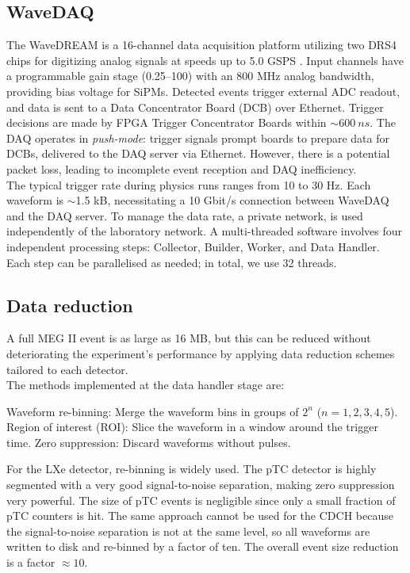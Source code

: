 \begin{refsection}
    \subsection{WaveDAQ}
    The WaveDREAM is a 16-channel data acquisition platform utilizing two DRS4 chips for digitizing analog signals at speeds up to 5.0 GSPS \cite{Ritt2010NIMA}.
    Input channels have a programmable gain stage (0.25–100) with an 800 MHz analog bandwidth, providing bias voltage for SiPMs. 
    Detected events trigger external ADC readout, and data is sent to a Data Concentrator Board (DCB) over Ethernet. 
    Trigger decisions are made by FPGA Trigger Concentrator Boards within $\sim\SI{600}{ns}$.
    The DAQ operates in \textit{push-mode}: trigger signals prompt boards to prepare data for DCBs, delivered to the DAQ server via Ethernet. However, there is a potential packet loss, leading to incomplete event reception and DAQ inefficiency.\\ 
    The typical trigger rate during physics runs ranges from 10 to 30 Hz. 
    Each waveform is $\sim$1.5 kB, necessitating a 10 Gbit/s connection between WaveDAQ and the DAQ server. 
    To manage the data rate, a private network, is used independently of the laboratory network. 
    A multi-threaded software involves four independent processing steps: Collector, Builder, Worker, and Data Handler. 
    Each step can be parallelised as needed; in total, we use 32 threads.

    \subsection{Data reduction}
        A full MEG II event is as large as 16 MB, but this can be reduced without deteriorating the experiment’s performance by applying data reduction schemes tailored to each detector.\\
        \noindent
        The methods implemented at the data handler stage are:
        \begin{outline}
            \1 Waveform re-binning: Merge the waveform bins in groups of \(2^n\) (\(n = 1, 2, 3, 4, 5\)).
            \1 Region of interest (ROI): Slice the waveform in a window around the trigger time.
            \1 Zero suppression: Discard waveforms without pulses.
        \end{outline}
        \noindent
        For the LXe detector, re-binning is widely used.
        The pTC detector is highly segmented with a very good signal-to-noise separation, making zero suppression very powerful. 
        The size of pTC events is negligible since only a small fraction of pTC counters is hit.
        The same approach cannot be used for the CDCH because the signal-to-noise separation is not at the same level, so all waveforms are written to disk and re-binned by a factor of ten. 
        The overall event size reduction is a factor $\approx 10$.


\end{refsection}
